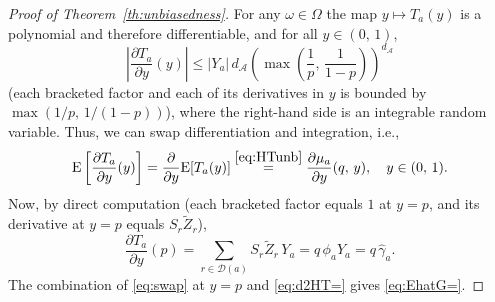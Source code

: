 \documentclass[sigconf]{acmart}
\newcommand{\E}{\mathrm E}
\begin{document}
\begin{proof}[Proof of Theorem~\ref{th:unbiasedness}]
For any $\omega\in\Omega$ the map $y\mapsto T_a(y)$ is a polynomial and therefore differentiable, and for all $y\in(0,\,1)$,
\begin{equation*}
    \left|\frac{\partial T_a}{\partial y}(y)\right|
    \le |Y_a|\, d_{\mathcal A}\left(\max\left(\frac 1p,\,\frac 1{1-p}\right)\right)^{d_{\mathcal A}}
\end{equation*}
(each bracketed factor and each of its derivatives in $y$ is bounded by $\max(1/p,\,1/(1-p))$), where the right-hand side is an integrable random variable. Thus, we can swap differentiation and integration, i.e.,
\begin{equation}\label{eq:swap}
    \E\left[\frac{\partial T_a}{\partial y}(y)\right] = \frac{\partial}{\partial y}\E[T_a(y)] \stackrel{\eqref{eq:HTunb}}{=} \frac{\partial \mu_a}{\partial y}(q,\,y),\quad y\in(0,\,1).
\end{equation}
Now, by direct computation (each bracketed factor equals $1$ at $y=p$, and its derivative at $y=p$ equals $S_r\tilde Z_r$),
\begin{equation}\label{eq:d2HT=}
    \frac{\partial T_a}{\partial y}(p) =
    \sum_{r\in\mathcal{D}(a)} S_r\tilde Z_r\, Y_a = q\,\phi_a Y_a = q\,\hat\gamma_a.
\end{equation}
The combination of \eqref{eq:swap} at $y=p$ and \eqref{eq:d2HT=} gives \eqref{eq:EhatG=}.


\end{proof}
\end{document}

